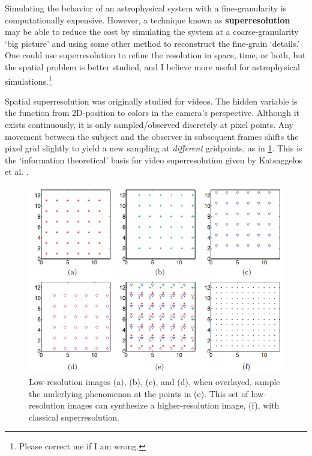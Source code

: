 Simulating the behavior of an astrophysical system with a fine-granularity is computationally expensive. However, a technique known as \textbf{superresolution} may be able to reduce the cost by simulating the system at a coarse-granularity `big picture' and using some other method to reconstruct the fine-grain `details.' One could use superresolution to refine the resolution in space, time, or both, but the spatial problem is better studied, and I believe more useful for astrophysical simulations.\footnote{Please correct me if I am wrong.}

Spatial superresolution was originally studied for videos. The hidden variable is the function from 2D-position to colors in the camera's perspective. Although it exists continuously, it is only sampled/observed discretely at pixel points.
Any movement between the subject and the observer in subsequent frames shifts the pixel grid slightly to yield a new sampling at \textit{different} gridpoints, as in \cref{classical-superresolution}.
This is the `information theoretical' basis for video superresolution given by Katsaggelos et al. \cite{synthesis-lecture}.

\begin{figure}
  \includegraphics[width=4.5in]{classical-superresolution.png}
  \caption{Low-resolution images (a), (b), (c), and (d), when overlayed, sample the underlying phenomenon at the points in (e). This set of low-resolution images can synthesize a higher-resolution image, (f), with classical superresolution.}
  \label{classical-superresolution}
\end{figure}

